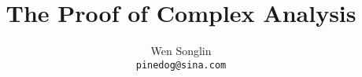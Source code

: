\documentclass[12pt]{book}
\begin{document}
\title{The Proof of Complex Analysis}
\author{Wen Songlin\\
        \tt\small pinedog@sina.com}
\date{}
\maketitle



\tableofcontents
\newpage

\mainmatter
{}



\end{document}
